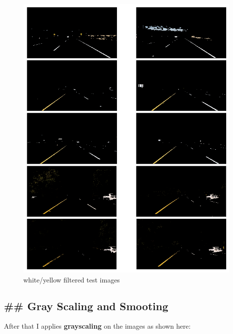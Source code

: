 \documentclass[11pt]{article}
\makeatletter
\def\maxwidth{\ifdim\Gin@nat@width>\linewidth\linewidth
    \else\Gin@nat@width\fi}
\let\Oldincludegraphics\includegraphics
\renewcommand{\includegraphics}[1]{\Oldincludegraphics[width=.8\maxwidth]{#1}}
\makeatother
\begin{document}
\begin{figure}
\centering
\includegraphics{test_images_output/white_yellow_filtered_hsl_images.png}
\caption{white/yellow filtered test images}
\end{figure}

\hypertarget{gray-scaling-and-smooting}{%
\subsection{\#\# Gray Scaling and
Smooting}\label{gray-scaling-and-smooting}}

After that I applies \textbf{grayscaling} on the images as shown here:
\end{document}
